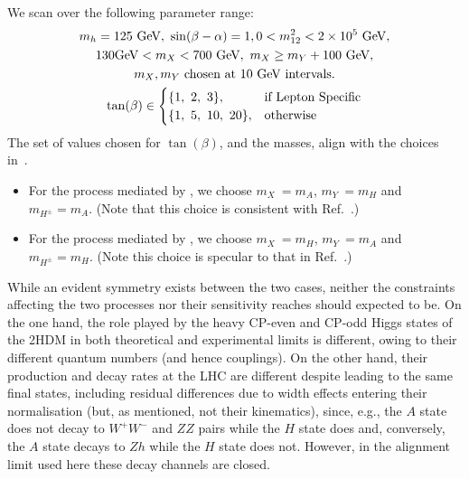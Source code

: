 We scan over the following parameter range:
\begin{equation}
\begin{gathered}
     m_{h} = 125~\text{GeV},~\sin(\beta-\alpha)=1, 0 < m_{12}^2 < 2\times 10^5~{\rm GeV},\\
     130 {\rm GeV} < m_X < 700~\text{GeV},~m_X \geq m_Y + 100~\text{GeV},\\
     m_X, m_Y~\text{chosen at}~10~\text{GeV intervals.}\\
     \tan(\beta)\in
         \begin{cases}
             \{1,~2,~3\}, & \text{if Lepton Specific}\\
             \{1,~5,~10,~20\}, & \text{otherwise}\\
         \end{cases}\\
\label{eq1}
\end{gathered}
\end{equation}
The set of values chosen for \(\tan(\beta)\), and the masses, align with the choices in~\cite{Aaboud2018AZHbbll}.
\begin{itemize}
    \item[\textbullet] For the process mediated by \AZH, we choose \(m_X~= m_A\), \(m_Y~= m_H\)  and \(m_{H^\pm} = m_A\). (Note that this choice is consistent with Ref.~\cite{Aaboud2018AZHbbll}.)
    \item[\textbullet] For the process mediated by \HZA, we choose \(m_X~= m_H\), \(m_Y~= m_A\)  and \(m_{H^\pm} = m_H\). (Note this choice is specular to that in Ref.~\cite{Aaboud2018AZHbbll}.) 
\end{itemize}


While an evident symmetry exists between the two cases, neither the constraints affecting the two processes nor their  sensitivity reaches should expected to be.
On the one hand, the role played by the heavy CP-even and CP-odd Higgs states of the 2HDM in both theoretical and experimental limits is different, owing to their different quantum numbers (and hence couplings).
On the other hand, their production and decay rates at the LHC are different despite leading to the same final states, including residual differences due to width effects entering their normalisation (but, as mentioned, not their kinematics), since, e.g., the $A$ state does not decay to $W^+W^-$ and $ZZ$ pairs while the $H$ state does and, conversely, the $A$ state decays to $Zh$ while the $H$ state does not.  
However, in the alignment limit used here these decay channels are closed.
